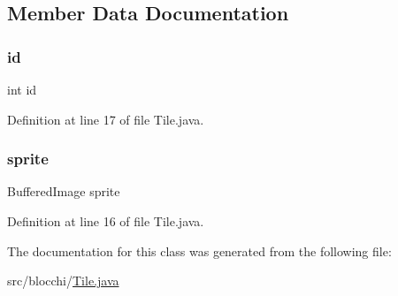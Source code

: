 \subsection{Member Data Documentation}
\mbox{\label{classblocchi_1_1_tile_a7441ef0865bcb3db9b8064dd7375c1ea}} 
\subsubsection{\texorpdfstring{id}{id}}
{\footnotesize\ttfamily int id\hspace{0.3cm}{\ttfamily [private]}}



Definition at line 17 of file Tile.\+java.

\mbox{\label{classblocchi_1_1_tile_a596d0c3eea54a08f78cbad0a4fbec565}} 
\subsubsection{\texorpdfstring{sprite}{sprite}}
{\footnotesize\ttfamily Buffered\+Image sprite\hspace{0.3cm}{\ttfamily [private]}}



Definition at line 16 of file Tile.\+java.



The documentation for this class was generated from the following file\+:\begin{DoxyCompactItemize}
\item 
src/blocchi/\hyperlink{_tile_8java}{Tile.\+java}\end{DoxyCompactItemize}

